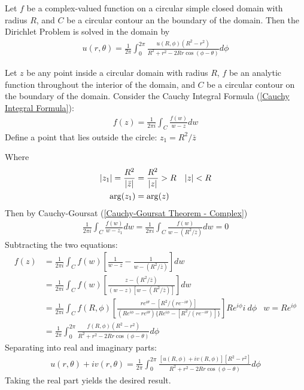 \documentclass[12pt, english]{book}
\makeatletter
\renewenvironment{proof}[1][\proofname]{\par
	\pushQED{\qed}%
	\normalfont \topsep6\p@\@plus6\p@\relax
	\list{}{%
		\settowidth{\leftmargin}{\itshape\proofname:\hskip\labelsep}%
		\setlength{\labelwidth}{0pt}%
		\setlength{\itemindent}{-\leftmargin}%
	}%
	\item[\hskip\labelsep\itshape#1\@addpunct{:}]\ignorespaces
	}{ \popQED\endlist\@endpefalse}
\makeatother
\begin{document}
	\begin{definition}
		\label{Poisson Integral Formula (Circle Interior) Definition - Complex}
		Let \(f\) be a complex-valued function on a circular simple closed domain with radius \(R\), and \(C\) be a circular contour an the boundary of the domain. Then the Dirichlet Problem is solved in the domain by
		\begin{align*}
			u(r, \theta)
			= \frac{1}{2\pi} \int_{0}^{2\pi} 
			  \frac{u(R, \phi)(R^2 - r^2)}{R^2 + r^2 - 2Rr \cos(\phi - \theta)} d\phi
		\end{align*}
	\end{definition}
	\begin{proof}
		Let \(z\) be any point inside a circular domain with radius \(R\), \(f\) be an analytic function throughout the interior of the domain, and \(C\) be a circular contour on the boundary of the domain. Consider the Cauchy Integral Formula (\cref{Cauchy Integral Formula}):
		\begin{align*}
			f(z) = \frac{1}{2\pi i} \int_{C} \frac{f(w)}{w-z} dw
		\end{align*}
		Define a point that lies outside the circle: \(z_1 = R^2/\bar{z}\)
		
		Where
		\begin{align*}
			\abs{z_1} = \frac{R^2}{\abs{\bar{z}}} &= \frac{R^2}{\abs{z}} > R & \abs{z} < R \\
			\arg(z_1) &= \arg(z)
		\end{align*}
		Then by Cauchy-Goursat (\cref{Cauchy-Goursat Theorem - Complex})
		\begin{align*}
			\frac{1}{2\pi i} \int_{C} \frac{f(w)}{w - z_1} dw 
			= \frac{1}{2\pi i} \int_{C} \frac{f(w)}{w - (R^2/\bar{z})} dw 
			= 0
		\end{align*}
		Subtracting the two equations:
		\begin{align*}
			f(z) 
			&= \frac{1}{2\pi i} \int_{C} f(w) \left[ \frac{1}{w - z} - \frac{1}{w - (R^2/\bar{z})}\right] dw \\
			&= \frac{1}{2\pi i} \int_{C} f(w) \left[\frac{z - (R^2/\bar{z})}{(w - z)[w - (R^2/\bar{z})]}\right] dw \\
			&= \frac{1}{2\pi i} \int_{C} f(R, \phi) \left[\frac{re^{i\theta}- [R^2/(re^{-i\theta})]}{(Re^{i\phi} - re^{i\theta})\{Re^{i\phi} - [R^2/(re^{-i\theta})]\}}\right] Re^{i\phi} i \ d\phi 
				& w = Re^{i\phi} \\
			&= \frac{1}{2\pi} \int_{0}^{2\pi} 
			   \frac{f(R,\phi)(R^2 - r^2)}{R^2 + r^2 - 2Rr \cos(\phi - \theta)} d\phi
		\end{align*}
		Separating into real and imaginary parts:
		\begin{align*}
			u(r,\theta) + iv(r,\theta)
			= \frac{1}{2\pi} \int_{0}^{2\pi}
			  \frac{[u(R,\phi) + iv(R,\phi)][R^2 - r^2]}{R^2 + r^2 - 2Rr\cos(\phi - \theta)}  d \phi
		\end{align*}
		Taking the real part yields the desired result.
	\end{proof}
\end{document}
